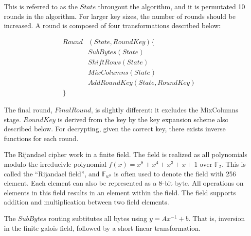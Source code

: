 This is referred to as the $State$ througout the algorithm, and it
is permutated 10 rounds in the algorithm. For larger key sizes, the
number of rounds should be increased. A round is composed of four
transformations described below:

\begin{eqnarray}
&Round&(State, RoundKey) \{\\
  & &SubBytes (State)\\
  & &ShiftRows (State)\\
  & &MixColumns (State)\\
  & &AddRoundKey (State, RoundKey)\\
&\}&
\end{eqnarray}

The final round, $FinalRound$, is slightly different: it excludes the
MixColumns stage. $RoundKey$ is derived from the key by the key
expansion scheme also described below. For decrypting, given the
correct key, there exists inverse functions for each round.

The Rijandael cipher work in a finite field. The field is realized as
all polynomials modulo the irreducivle polynomial $f(x) = x^8 + x^4 +
x^3 + x + 1$ over $\mathbb{F}_2$. This is called the ``Rijandael
field'', and $\mathbb{F}_{w^8}$ is often used to denote the field with
256 element. Each element can also be represented as a 8-bit byte. All
operations on elements in this field results in an element within the
field. The field supports addition and multiplication between two
field elements.

The $SubBytes$ routing subtitutes all bytes using $y = A x^{-1} + b$.
That is, inversion in the finite galois field, followed by a short
linear transformation.

